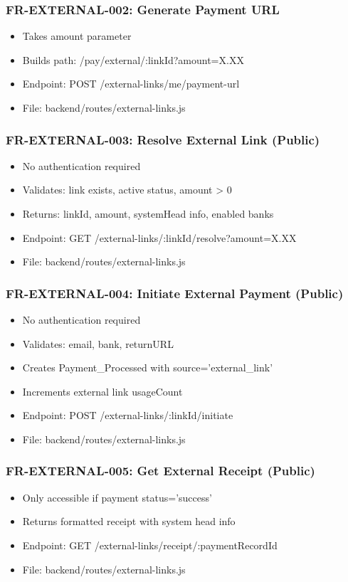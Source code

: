 \documentclass[12pt,a4paper]{article}
\begin{document}
\subsubsection{FR-EXTERNAL-002: Generate Payment URL}
\begin{itemize}
  \item Takes amount parameter
  \item Builds path: /pay/external/:linkId?amount=X.XX
  \item Endpoint: POST /external-links/me/payment-url
  \item File: backend/routes/external-links.js
\end{itemize}

\subsubsection{FR-EXTERNAL-003: Resolve External Link (Public)}
\begin{itemize}
  \item No authentication required
  \item Validates: link exists, active status, amount > 0
  \item Returns: linkId, amount, systemHead info, enabled banks
  \item Endpoint: GET /external-links/:linkId/resolve?amount=X.XX
  \item File: backend/routes/external-links.js
\end{itemize}

\subsubsection{FR-EXTERNAL-004: Initiate External Payment (Public)}
\begin{itemize}
  \item No authentication required
  \item Validates: email, bank, returnURL
  \item Creates Payment\_Processed with source='external\_link'
  \item Increments external link usageCount
  \item Endpoint: POST /external-links/:linkId/initiate
  \item File: backend/routes/external-links.js
\end{itemize}

\subsubsection{FR-EXTERNAL-005: Get External Receipt (Public)}
\begin{itemize}
  \item Only accessible if payment status='success'
  \item Returns formatted receipt with system head info
  \item Endpoint: GET /external-links/receipt/:paymentRecordId
  \item File: backend/routes/external-links.js
\end{itemize}
\end{document}
